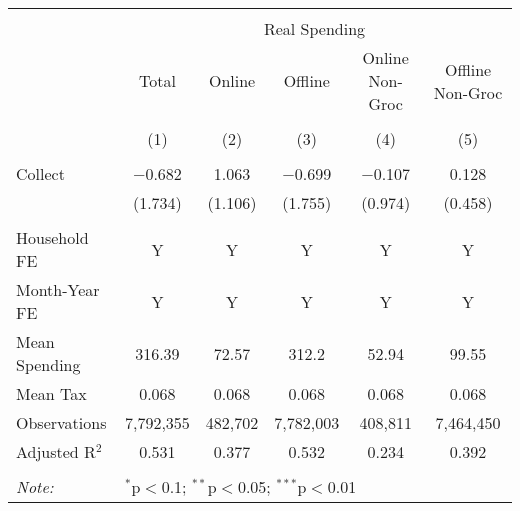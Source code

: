 
\begin{table}[!htbp] \centering 
  \caption{} 
  \label{} 
\begin{tabular}{@{\extracolsep{5pt}}lccccc} 
\\[-1.8ex]\hline 
\hline \\[-1.8ex] 
 & \multicolumn{5}{c}{Real Spending} \\ 
\cline{2-6} 
 & Total & Online & Offline & Online Non-Groc & Offline Non-Groc \\ 
\\[-1.8ex] & (1) & (2) & (3) & (4) & (5)\\ 
\hline \\[-1.8ex] 
 Collect & $-$0.682 & 1.063 & $-$0.699 & $-$0.107 & 0.128 \\ 
  & (1.734) & (1.106) & (1.755) & (0.974) & (0.458) \\ 
 \hline \\[-1.8ex] 
Household FE & Y & Y & Y & Y & Y \\ 
Month-Year FE & Y & Y & Y & Y & Y \\ 
Mean Spending & 316.39 & 72.57 & 312.2 & 52.94 & 99.55 \\ 
Mean Tax & 0.068 & 0.068 & 0.068 & 0.068 & 0.068 \\ 
Observations & 7,792,355 & 482,702 & 7,782,003 & 408,811 & 7,464,450 \\ 
Adjusted R$^{2}$ & 0.531 & 0.377 & 0.532 & 0.234 & 0.392 \\ 
\hline 
\hline \\[-1.8ex] 
\textit{Note:}  & \multicolumn{5}{l}{$^{*}$p$<$0.1; $^{**}$p$<$0.05; $^{***}$p$<$0.01} \\ 
\end{tabular} 
\end{table} 
